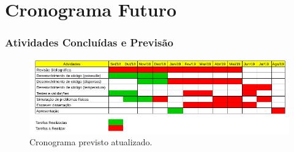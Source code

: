 \documentclass{beamer}
\begin{document}
\section{Cronograma Futuro}

\begin{frame}
  \frametitle{Atividades Concluídas e Previsão}
  \begin{figure}
    \includegraphics[width=\linewidth]{figure/Cronograma.png}
    \caption{Cronograma previsto atualizado.}
  \end{figure}
\end{frame}



% 
% 
% 
% 
\end{document}
